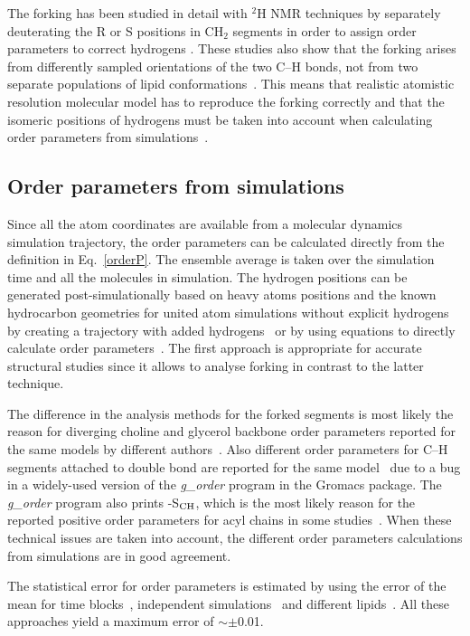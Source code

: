 \documentclass[aps,prl,superscriptaddress,twocolumn]{revtex4}
\begin{document}
The forking has been studied in detail with $^2$H NMR techniques by separately deuterating the 
R or S positions in CH$_2$ segments in order to assign order parameters to correct hydrogens \cite{gally81,engel81}.
These studies also show that the forking arises from differently sampled orientations 
of the two C--H bonds, not from two separate populations of lipid conformations~\cite{engel81,gally81}.
This means that realistic atomistic resolution molecular model has to reproduce the forking 
correctly and that the isomeric positions of hydrogens must be taken into account when calculating
order parameters from simulations~\cite{botan15}.



\subsection{Order parameters from simulations}

Since all the atom coordinates are available from a molecular dynamics simulation trajectory,
the order parameters can be calculated directly from the definition in Eq.~\ref{orderP}.
The ensemble average is taken over the simulation time and all the molecules in simulation.
The hydrogen positions can be generated post-simulationally based on heavy atoms positions and the 
known hydrocarbon geometries for united atom simulations without explicit hydrogens 
by creating a trajectory with added hydrogens~\cite{ollila07a,botan15} or by using equations to directly calculate 
order parameters~\cite{tieleman97,vermeer07}. The first approach is appropriate for accurate 
structural studies since it allows to analyse forking in contrast to the latter technique.

The difference in the analysis methods for the forked segments is most likely the reason for 
diverging choline and glycerol backbone order parameters reported for the same models by different 
authors~\cite{poger12,botan15}. Also different order parameters for C--H segments attached to double 
bond are reported for the same model~\cite{bachar04,ollila07a} due to a bug in a widely-used version of 
the {\it g\_order} program in the Gromacs package. The {\it g\_order} program also prints -S$_{{\rm CH}}$, 
which is the most likely reason for the reported positive order parameters for acyl chains in some studies~\cite{ekkabut07}.
When these technical issues are taken into account, the different order parameters calculations from simulations are 
in good agreement.

The statistical error for order parameters is estimated by using the error of the mean for time blocks~\cite{ollila07a},  
independent simulations~\cite{poger12} and different lipids~\cite{botan15}. All these approaches yield a maximum error of $\sim \pm$0.01.
\end{document}
